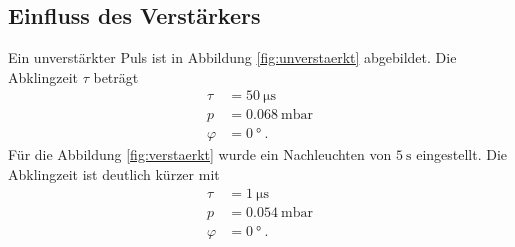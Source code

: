 \subsection{Einfluss des Verstärkers}
Ein unverstärkter Puls ist in Abbildung \ref{fig:unverstaerkt} abgebildet.
Die Abklingzeit $τ$ beträgt
\begin{align}
    τ &= \SI{50}{\micro\second} \\
    p &= \SI{0.068}{\milli\bar} \\
    φ &= \SI{0}{\degree}\:.
\end{align}
Für die Abbildung \ref{fig:verstaerkt} wurde ein Nachleuchten von
$\SI{5}{\second}$ eingestellt. Die Abklingzeit ist deutlich kürzer mit
\begin{align}
    τ &= \SI{1}{\micro\second} \\
    p &= \SI{0.054}{\milli\bar} \\
    φ &= \SI{0}{\degree}\:.
\end{align}
